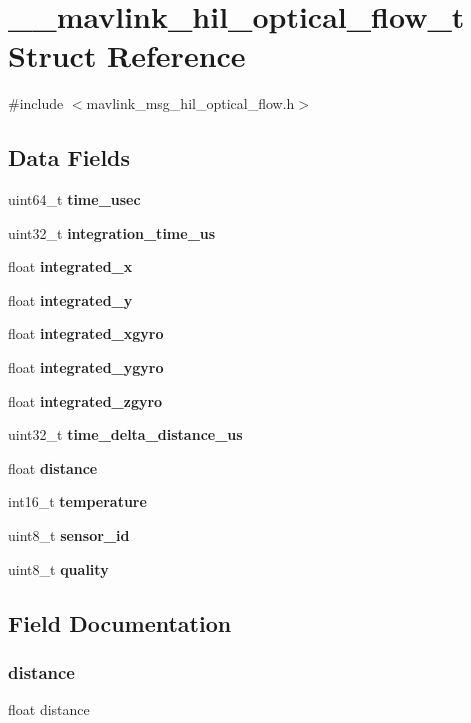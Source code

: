 \section{\+\_\+\+\_\+mavlink\+\_\+hil\+\_\+optical\+\_\+flow\+\_\+t Struct Reference}
\label{struct____mavlink__hil__optical__flow__t}


{\ttfamily \#include $<$mavlink\+\_\+msg\+\_\+hil\+\_\+optical\+\_\+flow.\+h$>$}

\subsection*{Data Fields}
\begin{DoxyCompactItemize}
\item 
uint64\+\_\+t \textbf{ time\+\_\+usec}
\item 
uint32\+\_\+t \textbf{ integration\+\_\+time\+\_\+us}
\item 
float \textbf{ integrated\+\_\+x}
\item 
float \textbf{ integrated\+\_\+y}
\item 
float \textbf{ integrated\+\_\+xgyro}
\item 
float \textbf{ integrated\+\_\+ygyro}
\item 
float \textbf{ integrated\+\_\+zgyro}
\item 
uint32\+\_\+t \textbf{ time\+\_\+delta\+\_\+distance\+\_\+us}
\item 
float \textbf{ distance}
\item 
int16\+\_\+t \textbf{ temperature}
\item 
uint8\+\_\+t \textbf{ sensor\+\_\+id}
\item 
uint8\+\_\+t \textbf{ quality}
\end{DoxyCompactItemize}


\subsection{Field Documentation}
\mbox{\label{struct____mavlink__hil__optical__flow__t_a06f14a9abd47b91465f895d5259cdc1b}} 
\subsubsection{distance}
{\footnotesize\ttfamily float distance}

